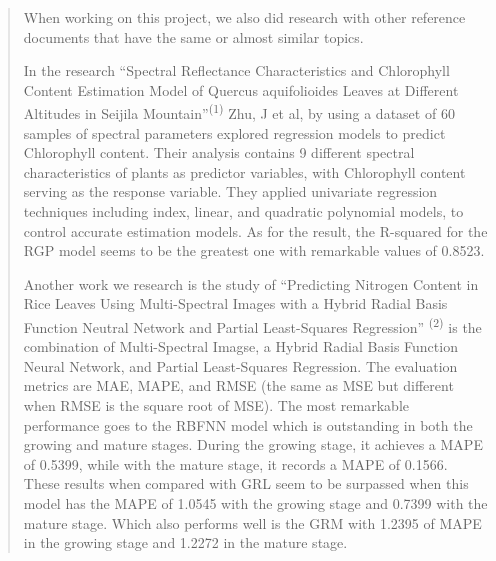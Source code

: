 \documentclass[
]{article}
\begin{document}
\begin{quote}
When working on this project, we also did research with other reference
documents that have the same or almost similar topics.

In the research ``Spectral Reflectance Characteristics and Chlorophyll
Content Estimation Model of Quercus aquifolioides Leaves at Different
Altitudes in Seijila Mountain''\textsuperscript{(1)} Zhu, J et al, by
using a dataset of 60 samples of spectral parameters explored regression
models to predict Chlorophyll content. Their analysis contains 9
different spectral characteristics of plants as predictor variables,
with Chlorophyll content serving as the response variable. They applied
univariate regression techniques including index, linear, and quadratic
polynomial models, to control accurate estimation models. As for the
result, the R-squared for the RGP model seems to be the greatest one
with remarkable values of 0.8523.

Another work we research is the study of ``Predicting Nitrogen Content
in Rice Leaves Using Multi-Spectral Images with a Hybrid Radial Basis
Function Neutral Network and Partial Least-Squares Regression''
\textsuperscript{(2)} is the combination of Multi-Spectral Imagse, a
Hybrid Radial Basis Function Neural Network, and Partial Least-Squares
Regression. The evaluation metrics are MAE, MAPE, and RMSE (the same as
MSE but different when RMSE is the square root of MSE). The most
remarkable performance goes to the RBFNN model which is outstanding in
both the growing and mature stages. During the growing stage, it
achieves a MAPE of 0.5399, while with the mature stage, it records a
MAPE of 0.1566. These results when compared with GRL seem to be
surpassed when this model has the MAPE of 1.0545 with the growing stage
and 0.7399 with the mature stage. Which also performs well is the GRM
with 1.2395 of MAPE in the growing stage and 1.2272 in the mature stage.


\end{quote}
\end{document}
